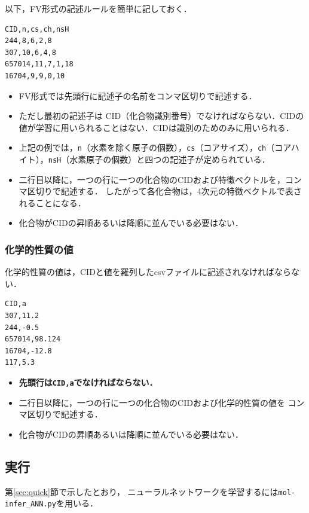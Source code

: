 \documentclass[11pt,dvipdfmx,twoside]{jarticle}
\newcommand{\secref}[1]{第\ref{sec:#1}節}
\begin{document}
以下，FV形式の記述ルールを簡単に記しておく．
\begin{oframed}
  {\small
\begin{verbatim}
CID,n,cs,ch,nsH
244,8,6,2,8
307,10,6,4,8
657014,11,7,1,18
16704,9,9,0,10
\end{verbatim}
}
\end{oframed}
\begin{itemize}
\item FV形式では先頭行に記述子の名前をコンマ区切りで記述する．
\item ただし最初の記述子は CID（化合物識別番号）でなければならない．CIDの値が学習に用いられることはない．CIDは識別のためのみに用いられる．
\item 上記の例では，\verb|n|（水素を除く原子の個数），\verb|cs|（コアサイズ），\verb|ch|（コアハイト），\verb|nsH|（水素原子の個数）と四つの記述子が定められている．
\item 二行目以降に，一つの行に一つの化合物のCIDおよび特徴ベクトルを，コンマ区切りで記述する．
  したがって各化合物は，4次元の特徴ベクトルで表されることになる．
\item 化合物がCIDの昇順あるいは降順に並んでいる必要はない．
\end{itemize}


\subsubsection{化学的性質の値}
化学的性質の値は，CIDと値を羅列したcsvファイルに記述されなければならない．
\begin{oframed}
  {\small
\begin{verbatim}
CID,a
307,11.2
244,-0.5
657014,98.124
16704,-12.8
117,5.3
\end{verbatim}
}
\end{oframed}
\begin{itemize}
\item {\bf 先頭行は\verb|CID,a|でなければならない．}
\item 二行目以降に，一つの行に一つの化合物のCIDおよび化学的性質の値を
  コンマ区切りで記述する．
\item 化合物がCIDの昇順あるいは降順に並んでいる必要はない．
\end{itemize}
  
\subsection{実行}
\secref{quick}で示したとおり，
ニューラルネットワークを学習するには{\tt mol-infer\_ANN.py}を用いる．
\end{document}
